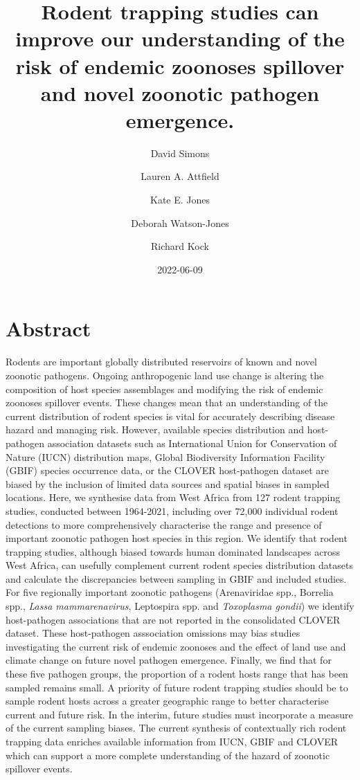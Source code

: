 \documentclass[
]{article}
\title{Rodent trapping studies can improve our understanding of the risk
of endemic zoonoses spillover and novel zoonotic pathogen emergence.}
\author{David Simons \and Lauren A. Attfield \and Kate E.
Jones \and Deborah Watson-Jones \and Richard Kock}
\date{2022-06-09}
\begin{document}
\maketitle

\hypertarget{abstract}{%
\section{Abstract}\label{abstract}}

Rodents are important globally distributed reservoirs of known and novel
zoonotic pathogens. Ongoing anthropogenic land use change is altering
the composition of host species assemblages and modifying the risk of
endemic zoonoses spillover events. These changes mean that an
understanding of the current distribution of rodent species is vital for
accurately describing disease hazard and managing risk. However,
available species distribution and host-pathogen association datasets
such as International Union for Conservation of Nature (IUCN)
distribution maps, Global Biodiversity Information Facility (GBIF)
species occurrence data, or the CLOVER host-pathogen dataset are biased
by the inclusion of limited data sources and spatial biases in sampled
locations. Here, we synthesise data from West Africa from 127 rodent
trapping studies, conducted between 1964-2021, including over 72,000
individual rodent detections to more comprehensively characterise the
range and presence of important zoonotic pathogen host species in this
region. We identify that rodent trapping studies, although biased
towards human dominated landscapes across West Africa, can usefully
complement current rodent species distribution datasets and calculate
the discrepancies between sampling in GBIF and included studies. For
five regionally important zoonotic pathogens (Arenaviridae spp.,
Borrelia spp., \emph{Lassa mammarenavirus}, Leptospira spp. and
\emph{Toxoplasma gondii}) we identify host-pathogen associations that
are not reported in the consolidated CLOVER dataset. These host-pathogen
asssociation omissions may bias studies investigating the current risk
of endemic zoonoses and the effect of land use and climate change on
future novel pathogen emergence. Finally, we find that for these five
pathogen groups, the proportion of a rodent hosts range that has been
sampled remains small. A priority of future rodent trapping studies
should be to sample rodent hosts across a greater geographic range to
better characterise current and future risk. In the interim, future
studies must incorporate a measure of the current sampling biases. The
current synthesis of contextually rich rodent trapping data enriches
available information from IUCN, GBIF and CLOVER which can support a
more complete understanding of the hazard of zoonotic spillover events.
\end{document}
